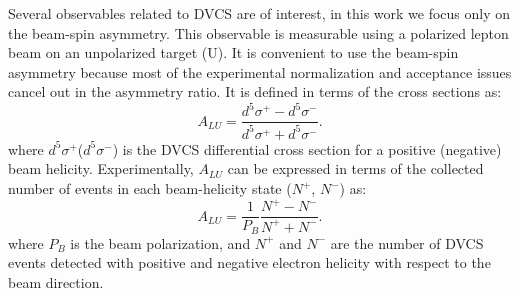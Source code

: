 \documentclass[nofootinbib,twocolumn,showpacs,prl,superscriptaddress,secnumarabic,amssymb,nobibnotes,aps,floatfix,preprint]{revtex4}
\begin{document}
Several observables related to DVCS are of interest, in this work we focus only 
on the beam-spin asymmetry. This  observable is measurable using a polarized 
lepton beam on an unpolarized target (U). It is convenient to use the beam-spin 
asymmetry because most of the experimental normalization and acceptance issues 
cancel out in the asymmetry ratio. It is defined in terms of the cross sections 
as:
  \begin{equation}
  A_{LU} = \frac{d^{5}\sigma^{+} - d^{5}\sigma^{-} }
                {d^{5}\sigma^{+} + d^{5}\sigma^{-}}.
    \label{BSA_equation}
  \end{equation}
where $d^{5}\sigma^{+}$($d^{5}\sigma^{-}$) is the DVCS differential cross 
section for a positive (negative) beam helicity. Experimentally, $A_{LU}$ 
can be expressed in terms of the collected number of events in each 
beam-helicity state ($N^{+}$, $N^{-}$) as:
\begin{equation}
A_{LU} = \frac{1}{P_{B}} \frac{N^{+} - N^{-}}{N^{+} + N^{-} }.
\end{equation}
where $P_{B}$ is the beam polarization, and $N^{+}$ and $N^{-}$ are the number 
of DVCS events detected with positive and negative electron helicity with 
respect to the beam direction. 
\end{document}
